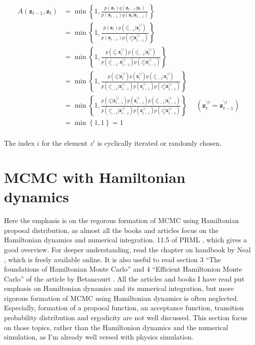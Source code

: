 \documentclass[a4]{article}
\begin{document}
\begin{equation}
\begin{aligned}
A\left(\bm{z}_{t-1}, \bm{z}_{t}\right)
 &= \min\left\{1, 
                \frac{ p(\bm{z}_t)q(\bm{z}_{t-1}|\bm{z}_t) }
                     { p(\bm{z}_{t-1})q(\bm{z}_{t}|\bm{z}_{t-1}) }
    \right\}\\
 &= \min\left\{1,
                \frac{ p(\bm{z}_t)     p(z^i_{t-1} |\bm{z}^{\setminus i}_t)     }
                     { p(\bm{z}_{t-1}) p(z^i_{t}   |\bm{z}^{\setminus i}_{t-1}) }
    \right\}\\
 &= \min\left\{1,
                \frac{ p(z^i_{t},   \bm{z}^{\setminus i}_{t})   p(z^i_{t-1}|\bm{z}^{\setminus i}_t    ) }
                     { p(z^i_{t-1}, \bm{z}^{\setminus i}_{t-1}) p(z^i_{t}  |\bm{z}^{\setminus i}_{t-1}) }
    \right\}\\
 &= \min\left\{1,
             \frac{ p(z^i_{t}   |\bm{z}^{\setminus i}_{t}  ) p(\bm{z}^{\setminus i}_{t})   p(z^i_{t-1}|\bm{z}^{\setminus i}_t    ) }
                  { p(z^i_{t-1} |\bm{z}^{\setminus i}_{t-1}) p(\bm{z}^{\setminus i}_{t-1}) p(z^i_{t}  |\bm{z}^{\setminus i}_{t-1}) }
    \right\}\\
 &= \min\left\{1,
             \frac{ p(z^i_{t}   |\bm{z}^{\setminus i}_{t-1}) p(\bm{z}^{\setminus i}_{t-1}) p(z^i_{t-1}|\bm{z}^{\setminus i}_{t-1}) }
                  { p(z^i_{t-1} |\bm{z}^{\setminus i}_{t-1}) p(\bm{z}^{\setminus i}_{t-1}) p(z^i_{t}  |\bm{z}^{\setminus i}_{t-1}) }
    \right\}\:\:\:\:\:\:\left(\bm{z}^{\setminus i}_{t} = \bm{z}^{\setminus i}_{t-1} \right)\\
 &= \min\left\{1,1\right\} = 1\label{eq:gibbs}\\
\end{aligned}
\end{equation}

The index $i$ for the element $z^i$ is cyclically iterated or randomly chosen.


\section{MCMC with Hamiltonian dynamics}
Here the emphasis is on the regorous formation of MCMC using Hamiltonian proposal distribution, as
almost all the books and articles focus on the Hamiltonian dynamics and numerical integration.
11.5 of PRML \cite{bishop2007}, which gives a good overview.
For deeper understanding, read the chapter on handbook by Neal \cite{hmcmc_neal}, which is freely available online.
It is also useful to read section 3 ``The foundations of Hamiltonian Monte Carlo''  and 4 ``Efficient Hamiltonion Monte Carlo''
of the article by Betancourt \cite{hmcmc_betancourt}.
All the articles and books I have read put emphasis on Hamiltonian dynamics and its numerical integration,
but more rigorous formation of MCMC using Hamiltonian dynamics is often neglected.
Especially, formation of a proposal function, an acceptance function, transition probability distribution and ergodicity
are not well discussed. This section focus on those topics, rather than the Hamiltonion dynamics
and the numerical simulation, as I'm already well versed with physics simulation.
\end{document}
